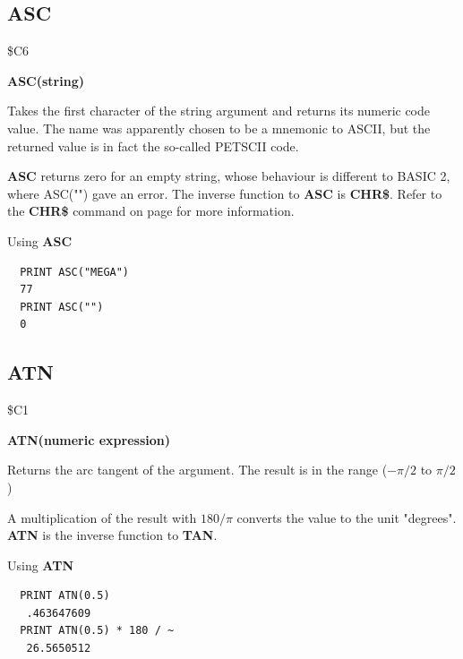 \subsection{ASC}
\begin{description}[leftmargin=2cm,style=nextline]
\item [Token:] \$C6
\item [Format:] {\bf ASC(string)}
\item [Usage:] Takes the first character of
               the string argument and returns its numeric code value.
               The name was apparently chosen to be a mnemonic to ASCII,
               but the returned value is in fact the so-called PETSCII code.
\item [Remarks:]
               {\bf ASC} returns zero for an empty string, whose behaviour
               is different to BASIC 2, where ASC("") gave an error.
               The inverse function to {\bf ASC} is {\bf CHR\$}.
               Refer to the {\bf CHR\$} command on page \pageref{chrcommand}
               for more information.

\item [Examples:] Using {\bf ASC}
\begin{tcolorbox}[colback=black,coltext=white]
\verbatimfont{\codefont}
\begin{verbatim}
  PRINT ASC("MEGA")
  77
  PRINT ASC("")
  0
\end{verbatim}
\end{tcolorbox}
\end{description}


\newpage
\subsection{ATN}
\begin{description}[leftmargin=2cm,style=nextline]
\item [Token:] \$C1
\item [Format:] {\bf ATN(numeric expression)}
\item [Usage:] Returns the arc tangent of the argument.
               The result is in the range ($-\pi/2$ to $\pi/2$)

\item [Remarks:]
               A multiplication of the result with $180/\pi$
               converts the value to the unit "degrees".
               {\bf ATN} is the inverse function to {\bf TAN}.
\item [Examples:] Using {\bf ATN}
\begin{tcolorbox}[colback=black,coltext=white]
\verbatimfont{\codefont}
\begin{verbatim}
  PRINT ATN(0.5)
   .463647609
  PRINT ATN(0.5) * 180 / ~
   26.5650512
\end{verbatim}
\end{tcolorbox}
\end{description}

